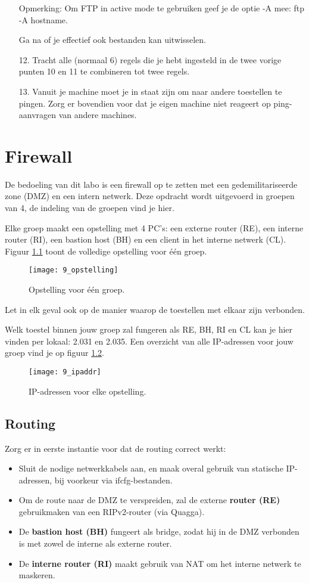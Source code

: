 \documentclass{report}
\begin{document}
\begin{enumerate}
    Opmerking: Om FTP in active mode te gebruiken geef je de optie -A mee: ftp -A hostname.

    Ga na of je effectief ook bestanden kan uitwisselen.
	\item[12.]     Tracht alle (normaal 6) regels die je hebt ingesteld in de twee vorige punten 10 en 11 te combineren tot twee regels.

	\item[13.]    Vanuit je machine moet je in staat zijn om naar andere toestellen te pingen. Zorg er bovendien voor dat je eigen machine niet reageert op ping-aanvragen van andere machines.
\end{enumerate}




\chapter{Firewall}
De bedoeling van dit labo is een firewall op te zetten met een gedemilitariseerde zone (DMZ) en een intern netwerk.
Deze opdracht wordt uitgevoerd in groepen van 4, de indeling van de groepen vind je hier.

Elke groep maakt een opstelling met 4 PC's: een externe router (RE), een interne router (RI), een bastion host (BH) en een client in het interne netwerk (CL).
Figuur \ref{fig:9_opstelling} toont de volledige opstelling voor één groep.
\begin{figure}[ht]
	\texttt{[image: 9\_opstelling]}
	\caption{Opstelling voor één groep.}
	\label{fig:9_opstelling}
\end{figure}
Let in elk geval ook op de manier waarop de toestellen met elkaar zijn verbonden.

Welk toestel binnen jouw groep zal fungeren als RE, BH, RI en CL kan je hier vinden per lokaal: 2.031 en 2.035.
Een overzicht van alle IP-adressen voor jouw groep vind je op figuur \ref{fig:9_ipaddr}.
\begin{figure}[ht]
	\texttt{[image: 9\_ipaddr]}
	\caption{IP-adressen voor elke opstelling.}
	\label{fig:9_ipaddr}
\end{figure}
\section{Routing}

Zorg er in eerste instantie voor dat de routing correct werkt:
\begin{itemize}
    \item Sluit de nodige netwerkkabels aan, en maak overal gebruik van statische IP-adressen, bij voorkeur via ifcfg-bestanden.
    \item Om de route naar de DMZ te verspreiden, zal de externe \textbf{router (RE)} gebruikmaken van een RIPv2-router (via Quagga).
    \item De \textbf{bastion host (BH)} fungeert als bridge, zodat hij in de DMZ verbonden is met zowel de interne als externe router.
    \item De \textbf{interne router (RI)} maakt gebruik van NAT om het interne netwerk te maskeren.
\end{itemize}
\end{document}
